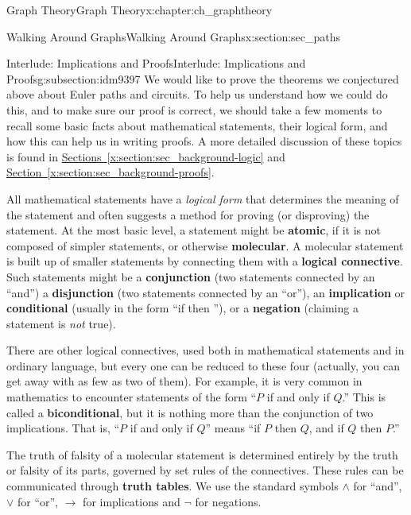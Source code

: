 \documentclass[oneside,10pt,]{book}
\newcommand{\terminology}[1]{\textbf{#1}}
\numberwithin{equation}{chapter}
\def\imp{\rightarrow}
\begin{document}
\begin{chapterptx}{Graph Theory}{}{Graph Theory}{}{}{x:chapter:ch_graphtheory}
\begin{sectionptx}{Walking Around Graphs}{}{Walking Around Graphs}{}{}{x:section:sec_paths}
\typeout{************************************************}
%
\begin{subsectionptx}{Interlude: Implications and Proofs}{}{Interlude: Implications and Proofs}{}{}{g:subsection:idm9397}
We would like to prove the theorems we conjectured above about Euler paths and circuits.  To help us understand how we could do this, and to make sure our proof is correct, we should take a few moments to recall some basic facts about mathematical statements, their logical form, and how this can help us in writing proofs.  A more detailed discussion of these topics is found in \hyperref[x:section:sec_background-logic]{Sections~\ref{x:section:sec_background-logic}} and \hyperref[x:section:sec_background-proofs]{Section~\ref{x:section:sec_background-proofs}}.%
\par
All mathematical statements have a \emph{logical form} that determines the meaning of the statement and often suggests a method for proving (or disproving) the statement.  At the most basic level, a statement might be \terminology{atomic}, if it is not composed of simpler statements, or otherwise \terminology{molecular}.  A molecular statement is built up of smaller statements by connecting them with a \terminology{logical connective}. Such statements might be a \terminology{conjunction} (two statements connected by an ``and'') a \terminology{disjunction} (two statements connected by an ``or''), an \terminology{implication} or \terminology{conditional} (usually in the form ``if \textellipsis{} then \textellipsis{}''), or a \terminology{negation} (claiming a statement is \emph{not} true).%
\par
There are other logical connectives, used both in mathematical statements and in ordinary language, but every one can be reduced to these four (actually, you can get away with as few as two of them).   For example, it is very common in mathematics to encounter statements of the form ``\(P\) if and only if \(Q\).''  This is called a \terminology{biconditional}, but it is nothing more than the conjunction of two implications.  That is, ``\(P\) if and only if \(Q\)'' means ``if \(P\) then \(Q\), and if \(Q\) then \(P\).''%
\par
The truth of falsity of a molecular statement is determined entirely by the truth or falsity of its parts, governed by set rules of the connectives.  These rules can be communicated through \terminology{truth tables}.  We use the standard symbols \(\wedge\) for ``and'', \(\vee\) for ``or'', \(\imp\) for implications and \(\neg\) for negations.%

\end{subsectionptx}
\end{sectionptx}
\end{chapterptx}
\end{document}
